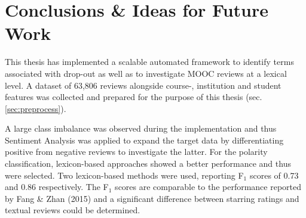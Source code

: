 \documentclass[
	a4paper,
	pdftex,
	12pt,	
	footinclude=true,
	fleqn,
	final,
	]{report}%
\begin{document}

\chapter{Conclusions \& Ideas for Future Work}
\label{ch:conclusions}
\vspace{-0.6cm}
This thesis has implemented a scalable automated framework to identify terms associated with drop-out 
as well as to investigate MOOC reviews at a lexical level. A dataset of 
63,806 reviews alongside course-, institution and student features 
was collected and prepared for the purpose of this thesis (sec.\ref{sec:preprocess}). 

A large class imbalance was observed during the implementation and thus 
Sentiment Analysis was applied to expand the target data by differentiating 
positive from negative reviews to investigate the latter. 
For the polarity classification, lexicon-based approaches showed a better performance 
and thus were selected. Two lexicon-based methods were used, reporting F$_{1}$ scores of 0.73 
and 0.86 respectively. The F$_{1}$ scores are comparable to the performance 
reported by Fang \& Zhan (2015)
\cite{Fang2015} and a significant difference between starring ratings and textual reviews
could be determined. 
\end{document}
